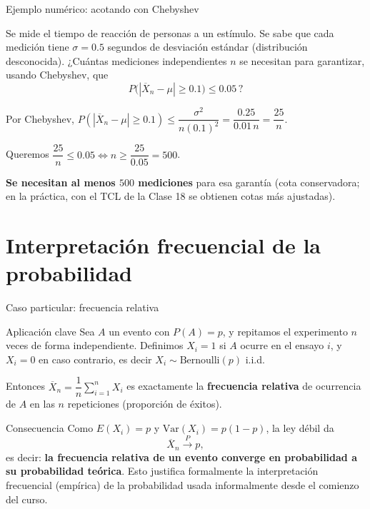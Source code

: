 \documentclass[aspectratio=169,11pt]{beamer}
\begin{document}
\begin{frame}{Ejemplo numérico: acotando con Chebyshev}
\begin{example}
Se mide el tiempo de reacción de personas a un estímulo. Se sabe que cada medición tiene $\sigma = 0.5$ segundos de desviación estándar (distribución desconocida). ¿Cuántas mediciones independientes $n$ se necesitan para garantizar, usando Chebyshev, que
\[
P\big(|\overline{X}_n - \mu| \geq 0.1\big) \leq 0.05\, ?
\]
\end{example}

\medskip
Por Chebyshev, $P(|\overline{X}_n-\mu|\geq 0.1) \leq \dfrac{\sigma^2}{n(0.1)^2} = \dfrac{0.25}{0.01\, n} = \dfrac{25}{n}$.

Queremos $\dfrac{25}{n} \leq 0.05 \iff n \geq \dfrac{25}{0.05} = 500$.

\textbf{Se necesitan al menos $500$ mediciones} para esa garantía (cota conservadora; en la práctica, con el TCL de la Clase 18 se obtienen cotas más ajustadas).
\end{frame}

\section{Interpretación frecuencial de la probabilidad}

\begin{frame}{Caso particular: frecuencia relativa}
\begin{block}{Aplicación clave}
Sea $A$ un evento con $P(A) = p$, y repitamos el experimento $n$ veces de forma independiente. Definimos $X_i = 1$ si $A$ ocurre en el ensayo $i$, y $X_i=0$ en caso contrario, es decir $X_i \sim \text{Bernoulli}(p)$ i.i.d.
\end{block}

Entonces $\overline{X}_n = \dfrac{1}{n}\sum_{i=1}^n X_i$ es exactamente la \textbf{frecuencia relativa} de ocurrencia de $A$ en las $n$ repeticiones (proporción de éxitos).

\begin{alertblock}{Consecuencia}
Como $E(X_i)=p$ y $\text{Var}(X_i)=p(1-p)$, la ley débil da
\[
\overline{X}_n \xrightarrow{P} p,
\]
es decir: \textbf{la frecuencia relativa de un evento converge en probabilidad a su probabilidad teórica}. Esto justifica formalmente la interpretación frecuencial (empírica) de la probabilidad usada informalmente desde el comienzo del curso.
\end{alertblock}
\end{frame}
\end{document}
